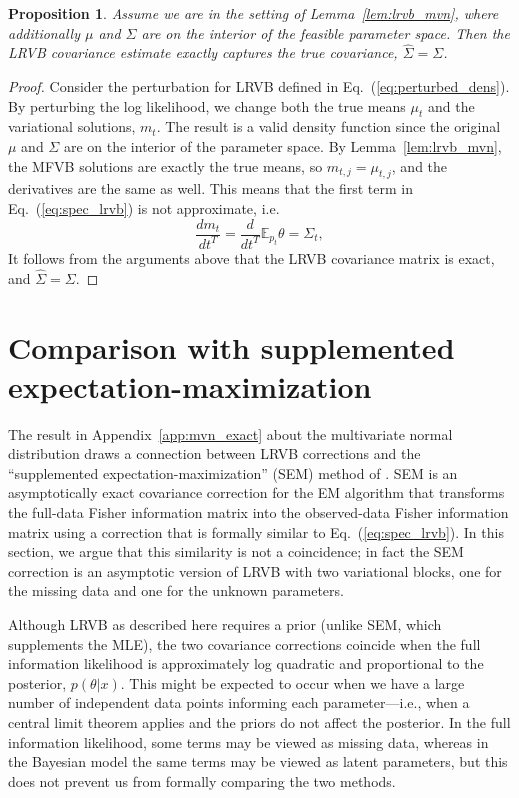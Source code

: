 \documentclass{article}\usepackage[]{graphicx}\usepackage[]{color}
\newcommand{\app}[1]{Appendix~\ref{app:#1}}
\newcommand{\lem}[1]{Lemma~\ref{lem:#1}}
\newcommand{\eq}[1]{Eq.~(\ref{eq:#1})}
\newcommand{\mpq}{m} %
\newcommand{\truecov}{\Sigma} %
\newtheorem{proposition}[theorem]{Proposition}
\newcommand{\mbe}{\mathbb{E}}
\begin{document}
\begin{proposition} \label{prop:lrvb_mvn}
  Assume we are in the setting of \lem{lrvb_mvn}, where additionally
  $\mu$ and $\Sigma$ are on the interior of the feasible parameter space.
  Then the LRVB covariance estimate exactly captures the true covariance,
  $\hat{\Sigma} = \Sigma$.

\end{proposition}

\begin{proof}

  Consider the perturbation for LRVB defined in \eq{perturbed_dens}.
  By perturbing the log likelihood, we change both the true means $\mu_t$
  and the variational solutions, $m_t$. The result is a valid
  density function since the original $\mu$ and $\Sigma$ are on the
  interior of the parameter space.
  By \lem{lrvb_mvn}, the MFVB solutions are exactly the true
  means, so $m_{t,j} = \mu_{t,j}$, and the derivatives are the same
  as well.  This means that the first term in \eq{spec_lrvb} is
  not approximate, i.e.
%
  \begin{equation*}
  \frac{d \mpq_{t}}{d t^{T}}
    = \frac{d}{d t^{T}} \mbe_{p_{t}} \theta
    = \truecov_{t},
  \end{equation*}
%
  It follows from the arguments above that the LRVB covariance
  matrix is exact, and $\hat{\Sigma} = \Sigma$.

\end{proof}


\section{Comparison with supplemented expectation-maximization}\label{app:SEM}

The result in \app{mvn_exact} about the multivariate normal distribution
draws a connection between LRVB
corrections and the ``supplemented expectation-maximization'' (SEM)
method of \citep{meng:1991:using}.  SEM is an asymptotically
exact covariance correction for the EM algorithm that transforms
the full-data Fisher information matrix into the observed-data Fisher
information matrix using a correction that is formally similar to
\eq{spec_lrvb}.  In this section, we argue that this similarity
is not a coincidence; in fact the SEM correction is an
asymptotic version of LRVB with two variational blocks,
one for the missing data and one for the unknown parameters.

Although LRVB as described here requires a prior
(unlike SEM, which supplements the MLE),
the two covariance corrections coincide when
the full information likelihood is approximately log quadratic
and proportional to the posterior, $p(\theta \vert x)$.
This might be expected to occur when we have a large number
of independent data points informing each parameter---i.e.,
when a central limit theorem applies and the priors do not
affect the posterior.
In the full information likelihood, some
terms may be viewed as missing data, whereas in the Bayesian
model the same terms may be viewed as latent parameters,
but this does not prevent us from formally comparing the two methods.
\end{document}
